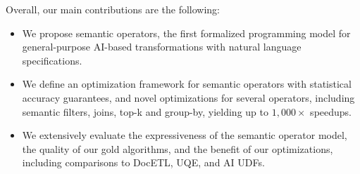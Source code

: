 Overall, our main contributions are the following:
\begin{itemize}
    \item We propose semantic operators, the first formalized programming model for general-purpose AI-based transformations with natural language specifications. 
    \item We define an optimization framework for semantic operators with statistical accuracy guarantees, and novel optimizations for several operators, including semantic filters, joins, top-k and group-by, yielding up to $1,000\times$ speedups.
    \item  We extensively evaluate the expressiveness of the semantic operator model, the quality of our gold algorithms, and the benefit of our optimizations, including comparisons to DocETL, UQE, and AI UDFs. 
\end{itemize}


